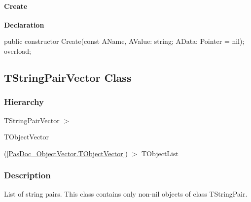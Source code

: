 \documentclass{report}
\newif\ifpdf
\begin{document}
\paragraph*{Create}\hspace*{\fill}

\label{PasDoc_StringPairVector.TStringPair-Create}
\begin{list}{}{
\setlength{\itemindent}{0cm}
\setlength{\listparindent}{0cm}
\setlength{\leftmargin}{\evensidemargin}
\addtolength{\leftmargin}{\tmplength}
\settowidth{\labelsep}{X}
\addtolength{\leftmargin}{\labelsep}
\setlength{\labelwidth}{\tmplength}
}
\item[\textbf{Declaration}\hfill]
\ifpdf
\begin{flushleft}
\fi
\begin{ttfamily}
public constructor Create(const AName, AValue: string; AData: Pointer = nil); overload;\end{ttfamily}

\ifpdf
\end{flushleft}
\fi

\end{list}
\ifpdf
\subsection*{\large{\textbf{TStringPairVector Class}}\normalsize\hspace{1ex}\hrulefill}
\else
\subsection*{TStringPairVector Class}
\fi
\label{PasDoc_StringPairVector.TStringPairVector}
\subsubsection*{\large{\textbf{Hierarchy}}\normalsize\hspace{1ex}\hfill}
TStringPairVector {$>$} \begin{ttfamily}TObjectVector\end{ttfamily}(\ref{PasDoc_ObjectVector.TObjectVector}) {$>$} 
TObjectList
\subsubsection*{\large{\textbf{Description}}\normalsize\hspace{1ex}\hfill}
List of string pairs. This class contains only non{-}nil objects of class TStringPair.
\end{document}
